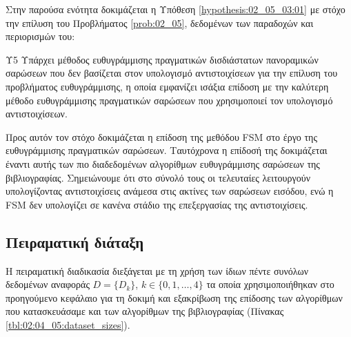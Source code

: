 Στην παρούσα ενότητα δοκιμάζεται η Υπόθεση \ref{hypothesis:02_05_03:01}
με στόχο την επίλυση του Προβλήματος \ref{prob:02_05}, δεδομένων των παραδοχών
και περιορισμών του:

\begin{customhypothesis}{Υ5}
  \label{hypothesis:02_05_03:01}
  Υπάρχει μέθοδος ευθυγράμμισης πραγματικών δισδιάστατων πανοραμικών σαρώσεων
  που δεν βασίζεται στον υπολογισμό αντιστοιχίσεων για την επίλυση του
  προβλήματος ευθυγράμμισης, η οποία εμφανίζει ισάξια επίδοση με την καλύτερη
  μέθοδο ευθυγράμμισης πραγματικών σαρώσεων που χρησιμοποιεί τον υπολογισμό
  αντιστοιχίσεων.
\end{customhypothesis}

Προς αυτόν τον στόχο δοκιμάζεται η επίδοση της μεθόδου FSM στο έργο της
ευθυγράμμισης πραγματικών σαρώσεων. Ταυτόχρονα η επίδοσή της δοκιμάζεται έναντι
αυτής των πιο διαδεδομένων αλγορίθμων ευθυγράμμισης σαρώσεων της βιβλιογραφίας.
Σημειώνουμε ότι στο σύνολό τους οι τελευταίες λειτουργούν υπολογίζοντας
αντιστοιχίσεις ανάμεσα στις ακτίνες των σαρώσεων εισόδου, ενώ η FSM δεν
υπολογίζει σε κανένα στάδιο της επεξεργασίας της αντιστοιχίσεις.


\subsection{Πειραματική διάταξη}
\label{subsection:02_05_03:01}

Η πειραματική διαδικασία διεξάγεται με τη χρήση των ίδιων πέντε συνόλων
δεδομένων αναφοράς $D = \{D_k\}$, $k \in \{0,1,\dots,4\}$ τα οποία
χρησιμοποιήθηκαν στο προηγούμενο κεφάλαιο για τη δοκιμή και εξακρίβωση της
επίδοσης των αλγορίθμων που κατασκευάσαμε και των αλγορίθμων της βιβλιογραφίας
(Πίνακας \ref{tbl:02:04_05:dataset_sizes}).


